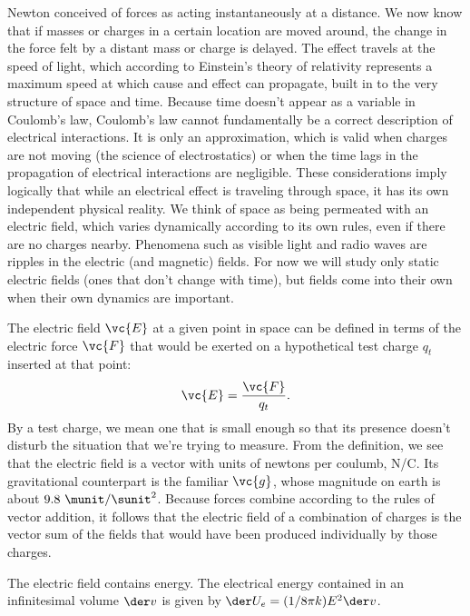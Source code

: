 Newton conceived of forces as acting instantaneously at a distance.
We now know that if masses or charges in a certain location are moved around,
the change in the force felt by a distant mass or charge is delayed. The effect
travels at the speed of light, which according to Einstein's theory of relativity
represents a maximum speed at which cause and effect can propagate, built in to
the very structure of space and time. Because time doesn't appear as a variable in
Coulomb's law, Coulomb's law cannot fundamentally be a correct description of
electrical interactions. It is only an approximation, which is valid when charges
are not moving (the science of electrostatics) or when the time lags in the propagation
of electrical interactions are negligible. These considerations imply logically that
while an electrical effect is traveling through space, it has its own independent
physical reality. We think of space as being permeated with an electric field,
which varies dynamically according to its own rules, even if there are no charges
nearby. Phenomena such as visible light and radio waves are ripples in the electric
(and magnetic) fields. For now we will study only static electric fields (ones that don't change
with time), but fields come into their own when their own dynamics are important.

The electric field $\vc{E}$ at a given point in space can be defined in terms of the electric
force $\vc{F}$ that would be exerted on a hypothetical test charge $q_t$ inserted at that
point:
\begin{equation}
  \vc{E} = \frac{\vc{F}}{q_t}.
\end{equation}
By a test charge, we mean one that is small enough so that its presence doesn't disturb
the situation that we're trying to measure. From the definition, we see that the electric
field is a vector with units of newtons per coulumb, N/C. Its gravitational counterpart
is the familiar $\vc{g}$, whose magnitude on earth is about $9.8\ \munit/\sunit^2$.
Because forces combine according to the rules of vector addition, it follows that
the electric field of a combination of charges is the vector sum of the fields that
would have been produced individually by those charges.

The electric field contains energy. The electrical energy contained in an
infinitesimal volume $\der v$ is given by $\der U_e = (1/8\pi k)E^2\der v$.
